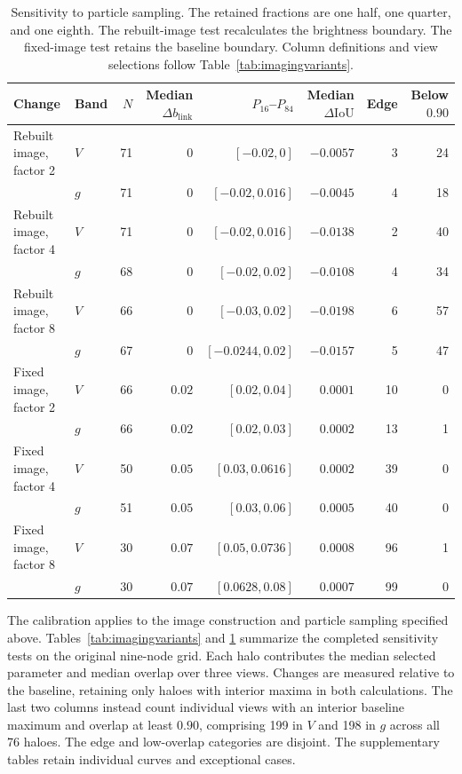 \documentclass[usenatbib]{mnras}
\begin{document}
\begin{table}
\centering
\caption{Sensitivity to particle sampling.
The retained fractions are one half, one quarter, and one eighth.
The rebuilt-image test recalculates the brightness boundary.
The fixed-image test retains the baseline boundary.
Column definitions and view selections follow
Table~\ref{tab:imagingvariants}.}
\label{tab:thinning}
\small
\setlength{\tabcolsep}{5pt}
\begin{tabular}{llrrrrrr}
\toprule
Change & Band & $N$ & Median $\Delta b_{\mathrm{link}}$ & $P_{16}$--$P_{84}$
& Median $\Delta\mathrm{IoU}$ & Edge & Below $0.90$ \\
\midrule
Rebuilt image, factor 2 & $V$ & 71 & $0$ & $[-0.02,0]$ & $-0.0057$ & 3 & 24 \\
 & $g$ & 71 & $0$ & $[-0.02,0.016]$ & $-0.0045$ & 4 & 18 \\
Rebuilt image, factor 4 & $V$ & 71 & $0$ & $[-0.02,0.016]$ & $-0.0138$ & 2 & 40 \\
 & $g$ & 68 & $0$ & $[-0.02,0.02]$ & $-0.0108$ & 4 & 34 \\
Rebuilt image, factor 8 & $V$ & 66 & $0$ & $[-0.03,0.02]$ & $-0.0198$ & 6 & 57 \\
 & $g$ & 67 & $0$ & $[-0.0244,0.02]$ & $-0.0157$ & 5 & 47 \\
Fixed image, factor 2 & $V$ & 66 & $0.02$ & $[0.02,0.04]$ & $0.0001$ & 10 & 0 \\
 & $g$ & 66 & $0.02$ & $[0.02,0.03]$ & $0.0002$ & 13 & 1 \\
Fixed image, factor 4 & $V$ & 50 & $0.05$ & $[0.03,0.0616]$ & $0.0002$ & 39 & 0 \\
 & $g$ & 51 & $0.05$ & $[0.03,0.06]$ & $0.0005$ & 40 & 0 \\
Fixed image, factor 8 & $V$ & 30 & $0.07$ & $[0.05,0.0736]$ & $0.0008$ & 96 & 1 \\
 & $g$ & 30 & $0.07$ & $[0.0628,0.08]$ & $0.0007$ & 99 & 0 \\
\bottomrule
\end{tabular}
\end{table}

The calibration applies to the image construction and particle sampling
specified above.
Tables~\ref{tab:imagingvariants} and \ref{tab:thinning} summarize the
completed sensitivity tests on the original nine-node grid.
Each halo contributes the median selected parameter and median overlap
over three views.
Changes are measured relative to the baseline, retaining only haloes
with interior maxima in both calculations.
The last two columns instead count individual views with an interior
baseline maximum and overlap at least $0.90$, comprising 199 in $V$
and 198 in $g$ across all 76 haloes.
The edge and low-overlap categories are disjoint.
The supplementary tables retain individual curves and exceptional cases.
\end{document}
